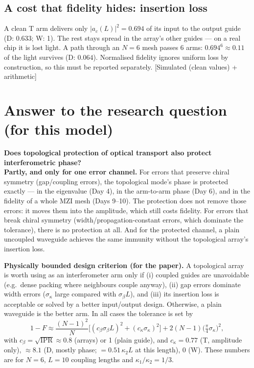 \documentclass[10pt,a4paper]{article}
\newcommand{\kc}{\kappa_2}
\newcommand{\note}[1]{\par\smallskip\noindent\colorbox{gray!12}{\parbox{\dimexpr\linewidth-2\fboxsep}{\small #1}}\par\smallskip}
\newcommand{\evd}[1]{\textsf{\small[#1]}}
\begin{document}
\subsection{A cost that fidelity hides: insertion loss}
A clean T arm delivers only $|a_c(L)|^2=0.694$ of its input to the output guide (D: 0.633; W: 1). The rest stays spread in the array's other guides --- on a real chip it is lost light. A path through an $N=6$ mesh passes 6 arms: $0.694^6\approx0.11$ of the light survives (D: $0.064$). Normalised fidelity ignores uniform loss by construction, so this must be reported separately. \evd{Simulated (clean values) + arithmetic}

\section{Answer to the research question (for this model)}
\note{\textbf{Does topological protection of optical transport also protect interferometric phase?}\\
\textbf{Partly, and only for one error channel.} For errors that preserve chiral symmetry (gap/coupling errors), the topological mode's phase is protected exactly --- in the eigenvalue (Day 4), in the arm-to-arm phase (Day 6), and in the fidelity of a whole MZI mesh (Days 9--10). The protection does not remove those errors: it moves them into the amplitude, which still costs fidelity. For errors that break chiral symmetry (width/propagation-constant errors, which dominate the tolerance), there is no protection at all. And for the protected channel, a plain uncoupled waveguide achieves the same immunity without the topological array's insertion loss.}

\textbf{Physically bounded design criterion (for the paper).} A topological array is worth using as an interferometer arm only if (i) coupled guides are unavoidable (e.g.\ dense packing where neighbours couple anyway), (ii) gap errors dominate width errors ($\sigma_\kappa$ large compared with $\sigma_\beta L$), and (iii) its insertion loss is acceptable or solved by a better input/output design. Otherwise, a plain waveguide is the better arm. In all cases the tolerance is set by
\[
1-F\approx\frac{(N-1)^2}{N}\big[(c_\beta\sigma_\beta L)^2+(c_\kappa\sigma_\kappa)^2\big]+2(N-1)\big(\tfrac\pi4\sigma_\kappa\big)^2,
\]
with $c_\beta=\sqrt{\mathrm{IPR}}\approx0.8$ (arrays) or 1 (plain guide), and $c_\kappa=0.77$ (T, amplitude only), $\approx8.1$ (D, mostly phase; $=0.51\,\kc L$ at this length), 0 (W). These numbers are for $N=6$, $L=10$ coupling lengths and $\kappa_1/\kappa_2=1/3$.
\end{document}

